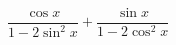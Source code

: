 \begin{ex}[type=expression]
	\begin{condition}
		\( \dfrac{\cos x}{1-2\sin^2x}+\dfrac{\sin x}{1-2\cos^2x} \)
	\end{condition}
\end{ex}